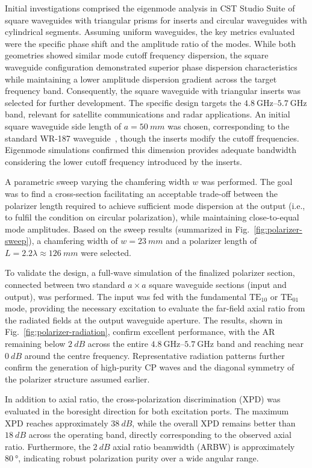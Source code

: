 \documentclass[journal]{IEEEtran}
\newcommand{\frequencyrange}{\qtyrange{4.8}{5.7}{\giga\hertz}}
\newcommand{\TE}[2]{\text{TE}_{#1#2}}
\begin{document}
Initial investigations comprised the eigenmode analysis in CST Studio Suite of square waveguides with triangular prisms for inserts and circular waveguides with cylindrical segments. Assuming uniform waveguides, the key metrics evaluated were the specific phase shift and the amplitude ratio of the modes. While both geometries showed similar mode cutoff frequency dispersion, the square waveguide configuration demonstrated superior phase dispersion characteristics while maintaining a lower amplitude dispersion gradient across the target frequency band. Consequently, the square waveguide with triangular inserts was selected for further development. The specific design targets the $\frequencyrange$ band, relevant for satellite communications and radar applications. An initial square waveguide side length of $a = \qty{50}{mm}$ was chosen, corresponding to the standard WR-187 waveguide~\cite{spinner:waveguide-specifications}, though the inserts modify the cutoff frequencies. Eigenmode simulations confirmed this dimension provides adequate bandwidth considering the lower cutoff frequency introduced by the inserts.

A parametric sweep varying the chamfering width $w$ was performed. The goal was to find a cross-section facilitating an acceptable trade-off between the polarizer length required to achieve sufficient mode dispersion at the output (i.e., to fulfil the condition on circular polarization), while maintaining close-to-equal mode amplitudes. Based on the sweep results (summarized in Fig.~\ref{fig:polarizer-sweep}), a chamfering width of $w = \qty{23}{mm}$ and a polarizer length of $L = 2.2\lambda \approx \qty{126}{mm}$ were selected.

To validate the design, a full-wave simulation of the finalized polarizer section, connected between two standard $a \times a$ square waveguide sections (input and output), was performed. The input was fed with the fundamental $\TE 10$ or $\TE 01$ mode, providing the necessary excitation to evaluate the far-field axial ratio from the radiated fields at the output waveguide aperture. The results, shown in Fig.~\ref{fig:polarizer-radiation}, confirm excellent performance, with the AR remaining below $\qty{2}{dB}$ across the entire $\frequencyrange$ band and reaching near $\qty{0}{dB}$ around the centre frequency. Representative radiation patterns further confirm the generation of high-purity CP waves and the diagonal symmetry of the polarizer structure assumed earlier.

In addition to axial ratio, the cross-polarization discrimination (XPD) was evaluated in the boresight direction for both excitation ports. The maximum XPD reaches approximately $\qty{38}{dB}$, while the overall XPD remains better than $\qty{18}{dB}$ across the operating band, directly corresponding to the observed axial ratio. Furthermore, the $\qty{2}{dB}$ axial ratio beamwidth (ARBW) is approximately $\qty{80}{\degree}$, indicating robust polarization purity over a wide angular range.
\end{document}
